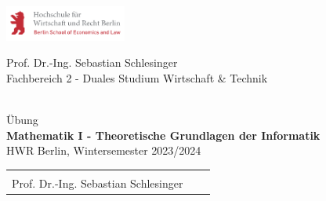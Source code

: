 \thispagestyle{scrplain}
\vspace*{-3cm}
\begin{minipage}[t][1.1cm][c]{4.5cm}
  \includegraphics[width=4cm]{include/hwr-logo.png}
\end{minipage}
\hfill
\begin{minipage}[t][1.5cm][c]{8cm}
  \begin{center}
  \begin{footnotesize}
    \textsf{Prof. Dr.-Ing. Sebastian Schlesinger} \\[-0.1cm]
    \textsf{Fachbereich 2 - Duales Studium Wirtschaft \& Technik}
  \end{footnotesize}
  \end{center}
\end{minipage}
\hfill

\vspace*{-0.3cm}
\begin{center} 
  \hrulefill \\[0.1cm]
  {\large Übung} \\[0.15cm]
  {\huge \bfseries Mathematik I - Theoretische Grundlagen der Informatik} \\[0.10cm]
  {HWR Berlin, Wintersemester 2023/2024} \\[-0.4cm]
  \begin{tabular}{lcr}
    \hspace{0.3\textwidth}   & \hspace{0.3\textwidth} & \hspace{0.3\textwidth} \\
    Prof. Dr.-Ing. Sebastian Schlesinger   %
  \end{tabular} \\[0.1cm]
  \hrulefill
\end{center}